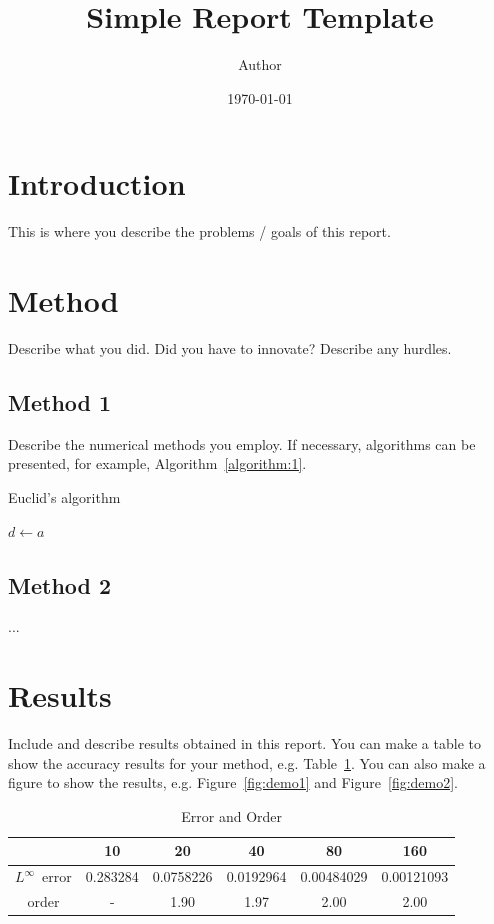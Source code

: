 \documentclass{article}
\title{Simple Report Template}
\author{Author}
\date{\today}
\begin{document}
\maketitle

\section{Introduction}

This is where you describe the problems / goals of this report.

\section{Method}

Describe what you did. Did you have to innovate? Describe any
hurdles.

\subsection{Method 1}

Describe the numerical methods you employ.
If necessary, algorithms can be presented, for example, Algorithm~\ref{algorithm:1}.


\begin{algorithm}
    \caption{Euclid's algorithm}\label{algorithm:1}
    $d \leftarrow a$\;
\end{algorithm}

\subsection{Method 2}

...

\section{Results}

Include and describe results obtained in this report.
You can make a table to show the accuracy results for your
method, e.g. Table~\ref{tab:demo0}.
You can also make a figure to show the results, e.g. Figure~\ref{fig:demo1} and Figure~\ref{fig:demo2}.


\begin{table}[ht]
    \centering
    \caption{Error and Order}\label{tab:demo0}
    \begin{tabular}{c|ccccc}
        \hline
                           & 10       & 20        & 40        & 80         & 160        \\
        \hline
        $L^{\infty}$~error & 0.283284 & 0.0758226 & 0.0192964 & 0.00484029 & 0.00121093 \\
        order              & -        & 1.90      & 1.97      & 2.00       & 2.00       \\
        \hline
    \end{tabular}
\end{table}
\end{document}
